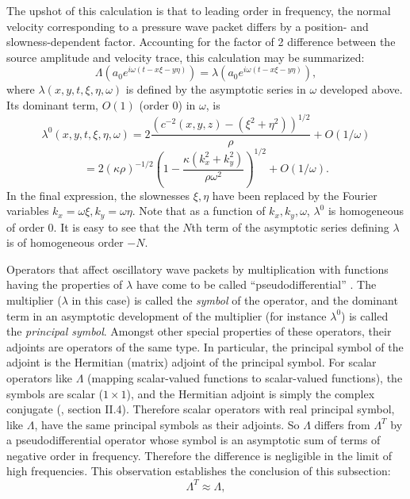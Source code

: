 \documentclass[12pt]{geophysics}
\begin{document}
The upshot of this calculation is that to leading order in frequency,
the normal velocity corresponding to a pressure wave packet differs by a position- and slowness-dependent
factor. Accounting for the factor of 2 difference between the source
amplitude and velocity trace, this calculation may be summarized:
\begin{equation}
  \label{eqn:lamwp}
  \Lambda (a_0e^{i\omega(t-x\xi-y\eta)}) = \lambda
  (a_0e^{i\omega(t-x\xi-y\eta)}),
\end{equation}
where $\lambda(x,y,t,\xi,\eta,\omega)$ is
defined by the asymptotic series in $\omega$ developed above. Its dominant term,
$O(1)$ (order 0) in $\omega$, is
\[
  \lambda^0(x,y,t,\xi,\eta,\omega) = 2\frac{( c^{-2}(x,y,z)-
    (\xi^2+\eta^2))^{1/2}}{\rho} + O(1/\omega)
\]
\begin{equation}
  \label{eqn:lamsymb}
= 2(\kappa
\rho)^{-1/2}\left(1-\frac{\kappa(k_x^2+k_y^2)}{\rho \omega^2}\right)^{1/2} + O(1/\omega).
\end{equation}
In the final expression, the slownesses $\xi,\eta$ have been replaced
by the Fourier variables $k_x=\omega\xi, k_y=\omega\eta$. Note that as a
function of $k_x,k_y,\omega$, $\lambda^0$ is homogeneous of order
0. It is easy to see that the $N$th term of the asymptotic series
defining $\lambda$ is of homogeneous order $-N$.

%
Operators that affect oscillatory wave packets by multiplication with
functions having the properties of $\lambda$ have come to
be called ``pseudodifferential'' \cite[]{Nir:72,Tay:81,SaiR:91}. The multiplier ($\lambda$ in this
case) is called the {\em symbol} of the operator, and the dominant
term in an asymptotic development of the multiplier
(for instance $\lambda^0$) is called the {\em principal symbol}.
Amongst other special properties of these operators, their adjoints
are operators of the same type. In particular, the principal symbol of the adjoint is
the Hermitian (matrix) adjoint of the principal symbol. For scalar
operators like $\Lambda$ (mapping scalar-valued functions to
scalar-valued functions), the symbols are scalar ($1 \times 1$), and
the Hermitian adjoint is simply the complex conjugate (\cite{Tay:81},
section II.4). Therefore scalar operators with real principal symbol,
like $\Lambda$, have the same principal symbols as their adjoints. So
$\Lambda$ differs from $\Lambda^T$ by a pseudodifferential operator
whose symbol is an asymptotic sum of terms of negative order in
frequency. Therefore the difference is negligible in the limit of high
frequencies. This observation establishes the conclusion of this subsection: 
\begin{equation}
  \label{eqn:lamappsim}
  \Lambda^T \approx \Lambda,
\end{equation}
\end{document}
